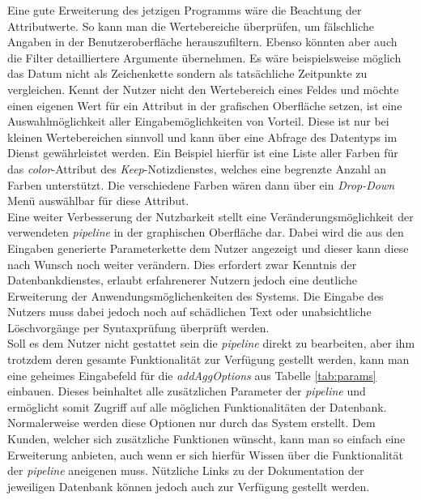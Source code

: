 Eine gute Erweiterung des jetzigen Programms wäre die Beachtung der Attributwerte. So kann man die Wertebereiche überprüfen, um fälschliche Angaben in der Benutzeroberfläche herauszufiltern. Ebenso könnten aber auch die Filter detailliertere Argumente übernehmen. Es wäre beispielsweise möglich das Datum nicht als Zeichenkette sondern als tatsächliche Zeitpunkte zu vergleichen. Kennt der Nutzer nicht den Wertebereich eines Feldes und möchte einen eigenen Wert für ein Attribut in der grafischen Oberfläche setzen, ist eine Auswahlmöglichkeit aller Eingabemöglichkeiten von Vorteil. Diese ist nur bei kleinen Wertebereichen sinnvoll und kann über eine Abfrage des Datentyps im Dienst gewährleistet werden. Ein Beispiel hierfür ist eine Liste aller Farben für das \textit{color}-Attribut des \textit{Keep}-Notizdienstes, welches eine begrenzte Anzahl an Farben unterstützt. Die verschiedene Farben wären dann über ein \textit{Drop-Down} Menü auswählbar für diese Attribut.\\
Eine weiter Verbesserung der Nutzbarkeit stellt eine Veränderungsmöglichkeit der verwendeten \textit{pipeline} in der graphischen Oberfläche dar. Dabei wird die aus den Eingaben generierte Parameterkette dem Nutzer angezeigt und dieser kann diese nach Wunsch noch weiter verändern. Dies erfordert zwar Kenntnis der Datenbankdienstes, erlaubt erfahrenerer Nutzern jedoch eine deutliche Erweiterung der Anwendungsmöglichenkeiten des Systems. Die Eingabe des Nutzers muss dabei jedoch noch auf schädlichen Text oder unabsichtliche Löschvorgänge per Syntaxprüfung überprüft werden.\\
Soll es dem Nutzer nicht gestattet sein die \textit{pipeline} direkt zu bearbeiten, aber ihm trotzdem deren gesamte Funktionalität zur Verfügung gestellt werden, kann man eine geheimes Eingabefeld für die \textit{addAggOptions} aus Tabelle \ref{tab:params} einbauen. Dieses beinhaltet alle zusätzlichen Parameter der \textit{pipeline} und ermöglicht somit Zugriff auf alle möglichen Funktionalitäten der Datenbank. Normalerweise werden diese Optionen nur durch das System erstellt. Dem Kunden, welcher sich zusätzliche Funktionen wünscht, kann man so einfach eine Erweiterung anbieten, auch wenn er sich hierfür Wissen über die Funktionalität der \textit{pipeline} aneigenen muss. Nützliche Links zu der Dokumentation der jeweiligen Datenbank können jedoch auch zur Verfügung gestellt werden. 


